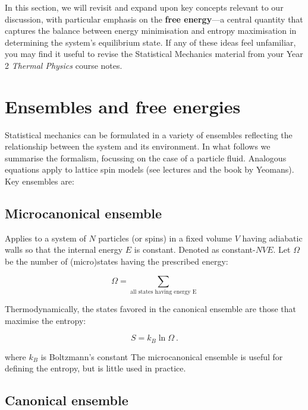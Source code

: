 \documentclass[
  letterpaper,
  DIV=11,
  numbers=noendperiod]{scrreprt}
\begin{document}
In this section, we will revisit and expand upon key concepts relevant
to our discussion, with particular emphasis on the \textbf{free
energy}---a central quantity that captures the balance between energy
minimisation and entropy maximisation in determining the system's
equilibrium state. If any of these ideas feel unfamiliar, you may find
it useful to revise the Statistical Mechanics material from your Year 2
\emph{Thermal Physics} course notes.

\section*{Ensembles and free
energies}\label{ensembles-and-free-energies}


Statistical mechanics can be formulated in a variety of ensembles
reflecting the relationship between the system and its environment. In
what follows we summarise the formalism, focussing on the case of a
particle fluid. Analogous equations apply to lattice spin models (see
lectures and the book by Yeomans). Key ensembles are:

\subsection*{Microcanonical ensemble}\label{microcanonical-ensemble}

Applies to a system of \(N\) particles (or spins) in a fixed volume
\(V\) having adiabatic walls so that the internal energy \(E\) is
constant. Denoted as constant-\(NVE\). Let \(\Omega\) be the number of
(micro)states having the prescribed energy:

\[
\Omega=\sum_\textrm{all states having energy E}
\]

Thermodynamically, the states favored in the canonical ensemble are
those that maximise the entropy:

\[
S=k_B\ln \Omega\: .
\]

where \(k_B\) is Boltzmann's constant The microcanonical ensemble is
useful for defining the entropy, but is little used in practice.

\subsection*{Canonical ensemble}\label{sec-canonical}
\end{document}
